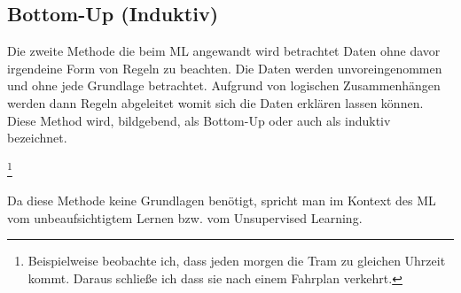 \documentclass[12pt,german,ngerman]{report}
\begin{document}
           
        
    \subsection{Bottom-Up (Induktiv)}
        Die zweite Methode die beim ML angewandt wird betrachtet Daten ohne davor irgendeine Form von Regeln zu beachten.  
        Die Daten werden unvoreingenommen und ohne jede Grundlage betrachtet.
        Aufgrund von logischen Zusammenhängen werden dann Regeln abgeleitet womit sich die Daten erklären lassen können.
        Diese Method wird, bildgebend, als Bottom-Up oder auch als induktiv\cite{dundi2021unileipzig} bezeichnet.
        
        \footnote{Beispielweise beobachte ich, dass jeden morgen die Tram zu gleichen Uhrzeit kommt. Daraus schließe ich 
        dass sie nach einem Fahrplan verkehrt.}

        Da diese Methode keine Grundlagen benötigt, spricht man
        im Kontext des ML vom unbeaufsichtigtem Lernen bzw. vom Unsupervised Learning.
\end{document}
